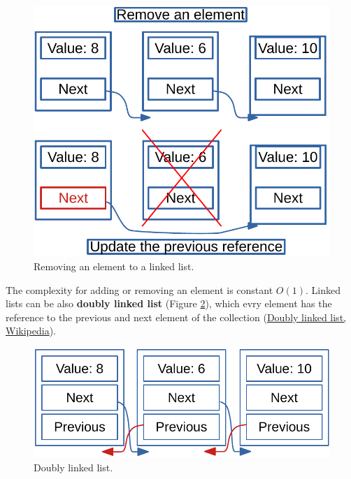 \begin{figure}[H]
	\begin{center}
		\includegraphics[scale=.6]{chapters/datastructures/images/linked_list_3.pdf}
		\caption[Removing an element to a linked list.]{Removing an element to a linked list.}
		\label{linked_list_3}
	\end{center}
\end{figure}
The complexity for adding or removing an element is constant \(O(1)\).
Linked lists can be also \textbf{doubly linked list} (Figure \ref{linked_list_4}), which evry element has the reference to the previous and next element of the collection \cite{wikidoublylinkedlist} (\href{https://en.wikipedia.org/wiki/Doubly_linked_list}{Doubly linked list, Wikipedia}).
\begin{figure}[H]
	\begin{center}
		\includegraphics[scale=.6]{chapters/datastructures/images/linked_list_4.pdf}
		\caption[Doubly linked list.]{Doubly linked list.}
		\label{linked_list_4}
	\end{center}
\end{figure} 

